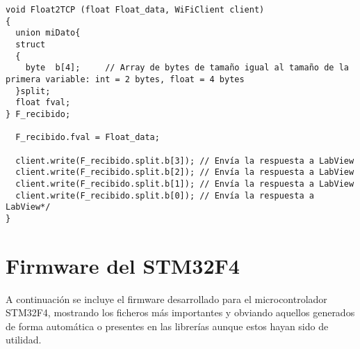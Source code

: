 \begin{lstlisting}[label=algoritmo:ESP:master_fast.ino,style = STM-code,frame=single,caption=ESP:master\_fast.ino]
void Float2TCP (float Float_data, WiFiClient client)
{
  union miDato{
  struct
  {
    byte  b[4];     // Array de bytes de tamaño igual al tamaño de la primera variable: int = 2 bytes, float = 4 bytes
  }split;
  float fval;
} F_recibido;

  F_recibido.fval = Float_data;
 
  client.write(F_recibido.split.b[3]); // Envía la respuesta a LabView
  client.write(F_recibido.split.b[2]); // Envía la respuesta a LabView
  client.write(F_recibido.split.b[1]); // Envía la respuesta a LabView
  client.write(F_recibido.split.b[0]); // Envía la respuesta a LabView*/
}
\end{lstlisting}

\chapter{Firmware del STM32F4\label{sec:Apendice_Code_STM}}

A continuación se incluye el firmware desarrollado para el microcontrolador STM32F4, mostrando los ficheros más importantes y obviando aquellos generados de forma automática o presentes en las librerías aunque estos hayan sido de utilidad.

